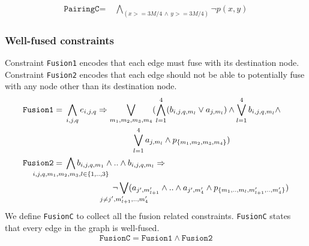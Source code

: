 \begin{align*}
 \texttt{PairingC} =\;& \bigwedge\limits_{(x >= 3M/4 \, \land \, y >= 3M/4)} \neg p(x,y)
\end{align*}

\subsubsection{Well-fused constraints}
Constraint \texttt{Fusion1} encodes that each edge must fuse with
its destination node.
%
Constraint \texttt{Fusion2} encodes that each edge should not
be able to potentially fuse with any node other than its destination node.
\begin{align*}
\texttt{Fusion1} =\;&
\bigwedge\limits_{i,j,q} e_{i,j,q} \limplies
\bigvee_{{m_1,m_2,m_3,m_4}} (\Land_{l=1}^4 ( b_{i,j,q,m_l} \lor a_{j,m_l} ) \land 
\Lor\limits_{l=1}^4 b_{i,j,q,m_l} \land\\
& \qquad \qquad \qquad \qquad \Lor\limits_{l=1}^4 a_{j,m_l}\land p_{\{m_1,m_2,m_3,m_4\}})
\\
\texttt{Fusion2} =\;&
\bigwedge\limits_{\mathclap{i,j,q,m_1,m_2,m_3, l \in \{1,..,3\}}} b_{i,j,q,m_1} \land ..\land b_{i,j,q,m_l} \limplies \\
& \hspace{2cm} \neg 
\bigvee_{\mathclap{j \neq j^{\prime}, m_{l+1}^{\prime},..,m_{4}^{\prime}}} ( a_{j^{\prime},m_{l+1}^{\prime}} \land .. \land a_{j^{\prime},m_4^{\prime}} \land p_{\{m_1,..,m_l,m^{\prime}_{l+1},..,m^{\prime}_4\}})
\\
\end{align*}
We define \texttt{FusionC} to collect all the fusion related constraints.
% 
\texttt{FusionC} states that every edge in the graph is well-fused.
\begin{align*}
\texttt{FusionC} = \texttt{Fusion1} \land \texttt{Fusion2} 
\end{align*}

